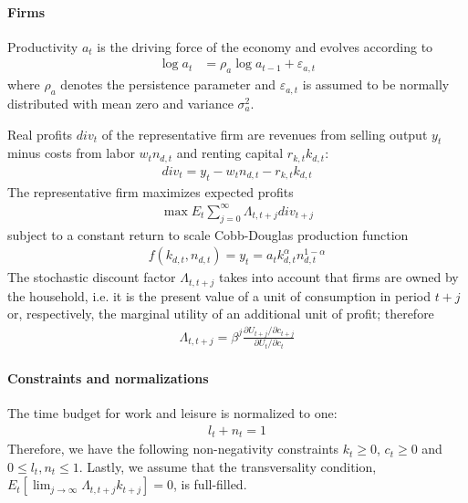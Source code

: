 \paragraph{Firms}
Productivity $a_t$ is the driving force of the economy and evolves according to
\begin{align*}
\log{a_{t}} &= \rho_a \log{a_{t-1}}  + \varepsilon_{a,t}
\end{align*}
where $\rho_a$ denotes the persistence parameter and $\varepsilon_{a,t}$ is assumed to be normally distributed with mean zero and variance $\sigma_a^2$.
	
Real profits ${div}_t$ of the representative firm are revenues from selling output $y_t$ minus costs from labor $w_t n_{d,t}$ and renting capital $r_{k,t} k_{d,t}$:
\begin{align*}
{div}_t = y_{t} - w_{t} n_{d,t} - r_{k,t} k_{d,t}
\end{align*}
The representative firm maximizes expected profits
\begin{align*}
	\max E_t \sum_{j=0}^{\infty} {\Lambda}_{t,t+j} {div}_{t+j}
\end{align*}
subject to a constant return to scale Cobb-Douglas production function
\begin{align*}
f(k_{d,t}, n_{d,t}) = y_t = a_t k_{d,t}^\alpha n_{d,t}^{1-\alpha}
\end{align*}
The stochastic discount factor ${\Lambda}_{t,t+j}$ takes into account that firms are owned by the household,
  i.e. it is the present value of a unit of consumption in period $t+j$ or, respectively,
  the marginal utility of an additional unit of profit;
  therefore
\begin{align*}
\Lambda_{t,t+j}=\beta^j \frac{\partial U_{t+j}/\partial c_{t+j}}{\partial U_{t}/\partial c_{t}}
\end{align*}

\paragraph{Constraints and normalizations}
The time budget for work and leisure is normalized to one:
\begin{align*}
l_t + n_t = 1
\end{align*}
Therefore, we have the following non-negativity constraints	$k_t \geq 0$, $c_t \geq 0$ and $0 \leq l_t,n_t \leq 1$.
Lastly, we assume that the transversality condition, $E_t [\lim_{j\rightarrow \infty} \Lambda_{t,t+j} k_{t+j}]=0$, is full-filled.

